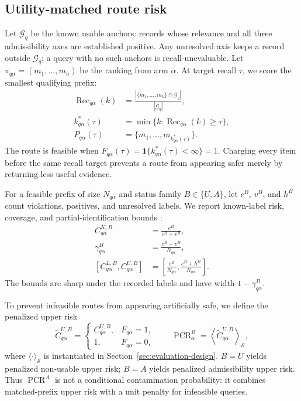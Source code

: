 \documentclass{article}
\begin{document}
\subsection{Utility-matched route risk}
\label{sec:matched-risk}

Let $\mathcal{G}_q$ be the known usable anchors: records whose relevance and all
three admissibility axes are established positive.  Any unresolved axis keeps a
record outside $\mathcal{G}_q$; a query with no such anchors is recall-unevaluable.
Let $\pi_{q\alpha}=(m_1,\ldots,m_n)$ be the ranking from arm $\alpha$.  At target
recall $\tau$, we score the smallest qualifying prefix:
\begin{align}
\operatorname{Rec}_{q\alpha}(k)
&=\frac{|\{m_1,\ldots,m_k\}\cap\mathcal{G}_q|}{|\mathcal{G}_q|},\\
k^*_{q\alpha}(\tau)
&=\min\{k:\operatorname{Rec}_{q\alpha}(k)\geq\tau\},\\
P_{q\alpha}(\tau)
&=\{m_1,\ldots,m_{k^*_{q\alpha}(\tau)}\}.
\label{eq:matched-prefix}
\end{align}
The route is feasible when
$F_{q\alpha}(\tau)=\mathbf{1}\{k^*_{q\alpha}(\tau)<\infty\}=1$.  Charging every item
before the same recall target prevents a route from appearing safer merely by
returning less useful evidence.

For a feasible prefix of size $N_{q\alpha}$ and status family $B\in\{U,A\}$, let
$c^B$, $v^B$, and $h^B$ count violations, positives, and unresolved labels.  We
report known-label risk, coverage, and partial-identification bounds
\citep{imbens2004confidence}:
\begin{align}
C^{K,B}_{q\alpha}
&=\frac{c^B}{c^B+v^B},\\
\gamma^B_{q\alpha}
&=\frac{c^B+v^B}{N_{q\alpha}},\\
\left[
C^{L,B}_{q\alpha},
C^{U,B}_{q\alpha}
\right]
&=\left[\frac{c^B}{N_{q\alpha}},
\frac{c^B+h^B}{N_{q\alpha}}\right].
\label{eq:matched-bounds}
\end{align}
The bounds are sharp under the recorded labels and have width $1-\gamma^B_{q\alpha}$.

To prevent infeasible routes from appearing artificially safe, we define the
penalized upper risk
\begin{equation}
\widetilde C^{U,B}_{q\alpha}
=
\begin{cases}
C^{U,B}_{q\alpha}, & F_{q\alpha}=1,\\
1, & F_{q\alpha}=0,
\end{cases}
\qquad
\operatorname{PCR}^{B}_{\alpha}
=
\left\langle
\widetilde C^{U,B}_{q\alpha}
\right\rangle_{\mathcal S},
\label{eq:penalized-risk}
\end{equation}
where $\langle\cdot\rangle_{\mathcal S}$ is instantiated in
Section~\ref{sec:evaluation-design}.  $B=U$ yields penalized non-usable upper risk;
$B=A$ yields penalized admissibility upper risk.  Thus $\operatorname{PCR}^{A}$ is
not a conditional contamination probability: it combines matched-prefix upper risk
with a unit penalty for infeasible queries.
\end{document}
